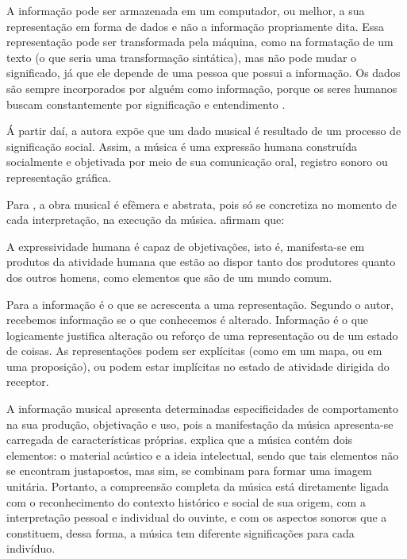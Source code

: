 A informação pode ser armazenada em um computador, ou melhor, a sua representação em forma de dados e não a informação propriamente dita. Essa representação pode ser transformada pela máquina, como na formatação de um texto (o que seria uma transformação sintática), mas não pode mudar o significado, já que ele depende de uma pessoa que possui a informação. Os dados são sempre incorporados por alguém como informação, porque os seres humanos buscam constantemente por significação e entendimento .

Á partir daí, a autora  expõe que um dado musical é resultado de um processo de significação social. Assim, a música é uma expressão humana construída socialmente e objetivada por meio de sua comunicação oral, registro sonoro ou representação gráfica.

Para , a obra musical é efêmera e abstrata, pois só se concretiza no momento de cada interpretação, na execução da música.  afirmam que:

\begin{citacao}
A expressividade humana é capaz de objetivações, isto é, manifesta-se em produtos da atividade humana que estão ao dispor tanto dos produtores quanto dos outros homens, como elementos que são de um mundo comum.
\end{citacao}

Para  a informação é o que se acrescenta a uma representação. Segundo o autor, recebemos informação se o que conhecemos é alterado. Informação é o que logicamente justifica alteração ou reforço de uma representação ou de um estado de coisas. As representações podem ser explícitas (como em um mapa, ou em uma proposição), ou podem estar implícitas no estado de atividade dirigida do receptor.

A informação musical apresenta determinadas especificidades de comportamento na sua produção, objetivação e uso, pois a manifestação da música apresenta-se carregada de características próprias.  explica que a música contém dois elementos: o material acústico e a ideia intelectual, sendo que tais elementos não se encontram justapostos, mas sim, se combinam para formar uma imagem unitária. Portanto, a compreensão completa da música está diretamente ligada com o reconhecimento do contexto histórico e social de sua origem, com a interpretação pessoal e individual do ouvinte, e com os aspectos sonoros que a constituem, dessa forma, a música tem diferente significações para cada indivíduo.

